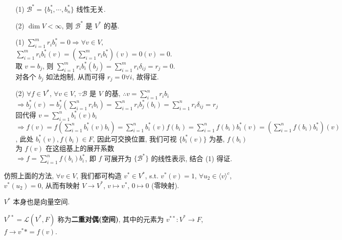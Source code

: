 \documentclass{note}
\begin{document}
\begin{thm}[(课本定理 3.12)]
    \begin{itemize}
        \item[(1)] $\mathcal{B}^*=\{b_1^*,\cdots,b_n^*\}$ 线性无关.
        \item[(2)] $\dim V<\infty$, 则 $\mathcal{B}^*$ 是 $V^*$ 的基.
    \end{itemize}
\end{thm}
\begin{pf}
    \begin{itemize}
        \item[(1)] $\sum_{i=1}^mr_ib_i^*=0\Longrightarrow\forall v\in V$, $\sum_{i=1}^mr_ib_i^*(v)=\left(\sum_{i=1}^mr_ib_i^*\right)(v)=0(v)=0$.\\
        取 $v=b_j$, 则 $\sum_{i=1}^mr_ib_i^*(b_j)=\sum_{i=1}^mr_i\delta_{ij}=r_j=0$.\\
        对各个 $b_j$ 如法炮制, 从而可得 $r_j=0\forall i$, 故得证.
        \item[(2)] $\forall f\in V^*$, $\forall v\in V$, $\because\mathcal{B}$ 是 $V$ 的基, $\therefore v=\sum_{i=1}^nr_ib_i$\\
        $\Longrightarrow b_j^*(v)=b_j^*\left(\sum_{i=1}^nr_ib_i\right)=\sum_{i=1}^nr_ib_j^*(b_i)=\sum_{i=1}^nr_i\delta_{ij}=r_j$\\
        回代得 $v=\sum_{i=1}^nb_i^*(v)b_i$\\
        $\Longrightarrow f(v)=f\left(\sum_{i=1}^nb_i^*(v)b_i\right)=\sum_{i=1}^nb_i^*(v)f(b_i)=\sum_{i=1}^nf(b_i)b_i^*(v)=\left(\sum_{i=1}^nf(b_i)b_i^*\right)(v)$, 此处 $b_i^*(v),f(b_i)\in F$, 因此可交换位置, 我们可视 $\{b_i^*(v)\}$ 为基, $f(b_i)$ 为 $f(v)$ 在这组基上的展开系数\\
        $\Longrightarrow f=\sum_{i=1}^nf(b_i)b_i^*$, 即 $f$ 可展开为 $\{\mathcal{B}^*\}$ 的线性表示, 结合 (1) 得证.
    \end{itemize}
\end{pf}

仿照上面的方法, $\forall v\in V$, 我们都可构造 $v^*\in V^*$, s.t. $v^*(v)=1$, $\forall u_2\in\langle v\rangle^c$, $v^*(u_2)=0$, 从而有映射 $V\rightarrow V^*$, $v\mapsto v^*$, $0\mapsto 0$ (零映射).

$V^*$ 本身也是向量空间.

\begin{df}[二重对偶(空间)]
    $V^{**}=\mathcal{L}(V^*,F)$ 称为\textbf{二重对偶(空间)}, 其中的元素为 $v^{**}:V^*\rightarrow F$, $f\rightarrow v^**=f(v)$.
\end{df}
\end{document}
